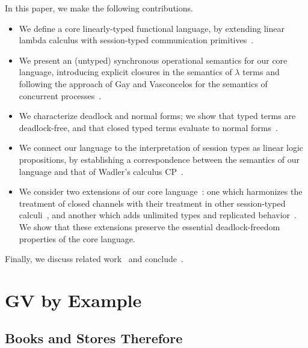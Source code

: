 \documentclass[orivec,envcountsame]{llncs}
\begin{document}
In this paper, we make the following contributions.
\begin{itemize}
\item We define a core linearly-typed functional language, by extending linear lambda calculus
  with session-typed communication primitives~.
\item We present an (untyped) synchronous operational semantics for our core language, introducing
  explicit closures in the semantics of $\lambda$ terms and following the approach of Gay and
  Vasconcelos for the semantics of concurrent processes~.
\item We characterize deadlock and normal forms; we show that typed terms are deadlock-free, and
  that closed typed terms evaluate to normal forms~.
\item We connect our language to the interpretation of session types as linear logic propositions,
  by establishing a correspondence between the semantics of our language and that of Wadler's
  calculus CP~.
\item We consider two extensions of our core language~: one which harmonizes the
  treatment of closed channels with their treatment in other session-typed calculi~,
  and another which adds unlimited types and replicated behavior~.  We show that
  these extensions preserve the essential deadlock-freedom properties of the core language.
\end{itemize}
Finally, we discuss related work~ and conclude~.

\section{GV by Example}\label{sec:examples}

\subsection{Books and Stores Therefore}

\end{document}
